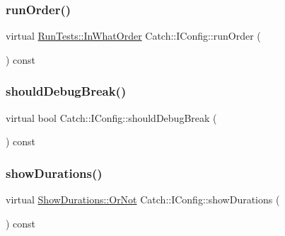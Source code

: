 \subsubsection{\texorpdfstring{runOrder()}{runOrder()}}
{\footnotesize\ttfamily virtual \mbox{\hyperlink{struct_catch_1_1_run_tests_ab56bd851b1dd085869992d1a9d73dc5d}{Run\+Tests\+::\+In\+What\+Order}} Catch\+::\+I\+Config\+::run\+Order (\begin{DoxyParamCaption}{ }\end{DoxyParamCaption}) const\hspace{0.3cm}{\ttfamily [pure virtual]}}

\mbox{\label{struct_catch_1_1_i_config_a5b886c5aad9001e90f63a7cf0726af63}} 
\subsubsection{\texorpdfstring{shouldDebugBreak()}{shouldDebugBreak()}}
{\footnotesize\ttfamily virtual bool Catch\+::\+I\+Config\+::should\+Debug\+Break (\begin{DoxyParamCaption}{ }\end{DoxyParamCaption}) const\hspace{0.3cm}{\ttfamily [pure virtual]}}

\mbox{\label{struct_catch_1_1_i_config_abaa97d281484278291f0d3db6d404aeb}} 
\subsubsection{\texorpdfstring{showDurations()}{showDurations()}}
{\footnotesize\ttfamily virtual \mbox{\hyperlink{struct_catch_1_1_show_durations_a82fa0174554187220c1eda175f122ee1}{Show\+Durations\+::\+Or\+Not}} Catch\+::\+I\+Config\+::show\+Durations (\begin{DoxyParamCaption}{ }\end{DoxyParamCaption}) const\hspace{0.3cm}{\ttfamily [pure virtual]}}

\mbox{\label{struct_catch_1_1_i_config_aa288bf92ccd0aafd85409d8aefdf738c}} 
